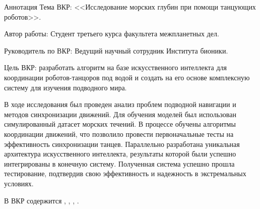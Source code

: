 \begin{addition}{Аннотация}
  Тема ВКР: <<Исследование морских глубин при помощи танцующих роботов>>.

  Автор работы: Студент третьего курса факультета межпланетных дел.

  Руководитель по ВКР: Ведущий научный сотрудник Института бионики.

  Цель ВКР: разработать алгоритм на базе искусственного интеллекта для координации роботов-танцоров под водой и создать на его основе комплексную систему для изучения подводного мира.

  В ходе исследования был проведен анализ проблем подводной навигации и методов синхронизации движений. Для обучения моделей был использован симулированный датасет морских течений. В процессе обучены алгоритмы координации движений, что позволило провести первоначальные тесты на эффективность синхронизации танцев. Параллельно разработана уникальная архитектура искусственного интеллекта, результаты которой были успешно интегрированы в конечную систему. Полученная система успешно прошла тестирование, подтвердив свою эффективность и надежность в экстремальных условиях.

  В ВКР содержится \printtotalpages{}, \printtotalreferences{}, \printtotalfigures{}, \printtotaltables{}.
\end{addition}